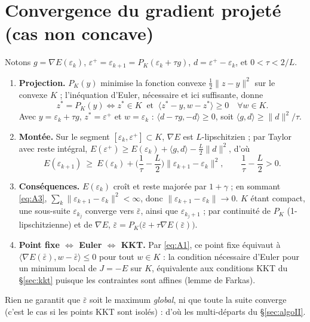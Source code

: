 \documentclass[11pt,a4paper]{article}
\newcommand{\sca}[2]{\langle #1,#2\rangle}
\newcommand{\nr}[1]{\|#1\|}
\theoremstyle{plain}
\begin{document}
\section{Convergence du gradient projeté (cas non concave)}\label{app:convergence}
Notons $g=\nabla E(\varepsilon_k)$, $\varepsilon^+=\varepsilon_{k+1}=P_K(\varepsilon_k+\tau g)$, $d=\varepsilon^+-\varepsilon_k$, et $0<\tau<2/L$.
\begin{enumerate}
\item \textbf{Projection.} $P_K(y)$ minimise la fonction convexe $\tfrac12\nr{z-y}^2$ sur le convexe $K$ ; l'inéquation d'Euler, nécessaire et ici suffisante, donne
\begin{equation*}\label{eq:A1}
z^*=P_K(y)\iff z^*\in K\ \text{ et }\ \sca{z^*-y}{w-z^*}\ge0\quad\forall w\in K.\tag{A.1}
\end{equation*}
Avec $y=\varepsilon_k+\tau g$, $z^*=\varepsilon^+$ et $w=\varepsilon_k$ : $\sca{d-\tau g}{-d}\ge0$, soit $\sca{g}{d}\ge\nr{d}^2/\tau$.
\item \textbf{Montée.} Sur le segment $[\varepsilon_k,\varepsilon^+]\subset K$, $\nabla E$ est $L$-lipschitzien ; par Taylor avec reste intégral, $E(\varepsilon^+)\ge E(\varepsilon_k)+\sca{g}{d}-\frac L2\nr{d}^2$, d'où
\begin{equation*}\label{eq:A3}
E(\varepsilon_{k+1})\ \ge\ E(\varepsilon_k)+\Big(\frac1\tau-\frac L2\Big)\nr{\varepsilon_{k+1}-\varepsilon_k}^2,\qquad \frac1\tau-\frac L2>0.\tag{A.2}
\end{equation*}
\item \textbf{Conséquences.} $E(\varepsilon_k)$ croît et reste majorée par $1+\gamma$ ; en sommant \eqref{eq:A3}, $\sum_k\nr{\varepsilon_{k+1}-\varepsilon_k}^2<\infty$, donc $\nr{\varepsilon_{k+1}-\varepsilon_k}\to0$. $K$ étant compact, une sous-suite $\varepsilon_{k_j}$ converge vers $\bar\varepsilon$, ainsi que $\varepsilon_{k_j+1}$ ; par continuité de $P_K$ (1-lipschitzienne) et de $\nabla E$, $\bar\varepsilon=P_K\big(\bar\varepsilon+\tau\nabla E(\bar\varepsilon)\big)$.
\item \textbf{Point fixe $\iff$ Euler $\iff$ KKT.} Par \eqref{eq:A1}, ce point fixe équivaut à $\sca{\nabla E(\bar\varepsilon)}{w-\bar\varepsilon}\le0$ pour tout $w\in K$ : la condition nécessaire d'Euler pour un minimum local de $J=-E$ sur $K$, équivalente aux conditions KKT du §\ref{sec:kkt} puisque les contraintes sont affines (lemme de Farkas).
\end{enumerate}
Rien ne garantit que $\bar\varepsilon$ soit le maximum \emph{global}, ni que toute la suite converge (c'est le cas si les points KKT sont isolés) : d'où les multi-départs du §\ref{sec:algoII}.
\end{document}
